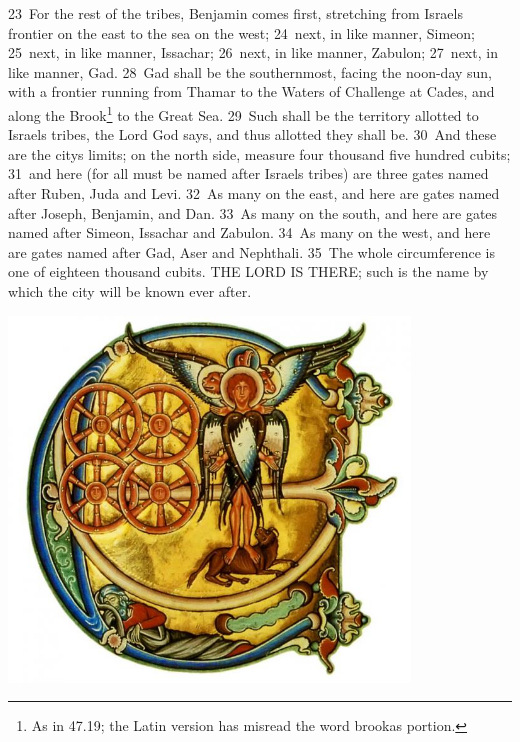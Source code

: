 \documentclass[10pt]{book} %
\begin{document}
\textcolor{benred8}{23}~For the rest of the tribes, Benjamin comes first, stretching from Israel\textquotesingle s frontier on the east to the sea on the west; \textcolor{benred8}{24}~next, in like manner, Simeon; \textcolor{benred8}{25}~next, in like manner, Issachar; \textcolor{benred8}{26}~next, in like manner, Zabulon; \textcolor{benred8}{27}~next, in like manner, Gad. \textcolor{benred8}{28}~Gad shall be the southernmost, facing the noon-day sun, with a frontier running from Thamar to the Waters of Challenge at Cades, and along the Brook\footnote[3]{As in 47.19; the Latin version has misread the word \textasciigrave brook\textquotesingle  as \textasciigrave portion\textquotesingle .} to the Great Sea. \textcolor{benred8}{29}~Such shall be the territory allotted to Israel\textquotesingle s tribes, the Lord God says, and thus allotted they shall be.
\textcolor{benred8}{30}~And these are the city\textquotesingle s limits; on the north side, measure four thousand five hundred cubits; \textcolor{benred8}{31}~and here (for all must be named after Israel\textquotesingle s tribes) are three gates named after Ruben, Juda and Levi. \textcolor{benred8}{32}~As many on the east, and here are gates named after Joseph, Benjamin, and Dan. \textcolor{benred8}{33}~As many on the south, and here are gates named after Simeon, Issachar and Zabulon. \textcolor{benred8}{34}~As many on the west, and here are gates named after Gad, Aser and Nephthali. \textcolor{benred8}{35}~The whole circumference is one of eighteen thousand cubits. THE LORD IS THERE; such is the name by which the city will be known ever after.

\vspace{0.5cm}


\begin{center}\includegraphics[width=0.8\textwidth]{ezechiel.jpg}\end{center}
\end{document}
